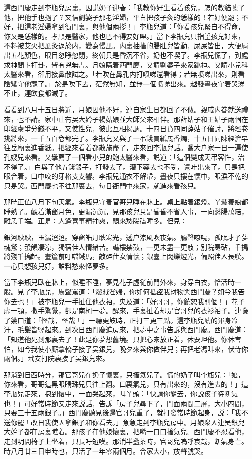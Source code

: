 這西門慶走到李瓶兒房裏，因説奶子迎春：「我教你好生看着孩兒，怎的教貓唬了他，把他手也撾了？又信劉婆子那老淫婦，平白把孩子灸的恁樣的！若好便罷；不好，把這老淫婦拿到衙門裏，與他個兩拶！」李瓶兒道：「你看孩兒緊自不得命，你又是恁樣的。孝順是醫家，他也巴不得要好哩。」當下李瓶兒只指望孩兒好來，不料被艾火把風灸返於内，變為慢風。内裏抽搐的腸肚兒皆動，尿屎皆出，大便屙出五花顏色，眼目忽睜忽閉，終朝只是昏沉不省，奶也不喫了。李瓶兒慌了，到處求神問卜打卦，皆有兇無吉。月娘瞞着西門慶，又請劉婆子來家跳神。又請小兒科太醫來看，卻用接鼻散試之。「若吹在鼻孔内打喷㖒還看得；若無喷㖒出來，則看陰騭守他罷了。」於是吹下去，茫然無知，並無一個喷㖒出來。越發晝夜守着哭涕不止，連飲食都減了。

看看到八月十五日將近，月娘因他不好，連自家生日都回了不做。親戚内眷就送禮來，也不請。家中止有吴大妗子楊姑娘並大師父來相伴。那薛姑子和王姑子兩個在印經䖏爭分錢不平，又使性兒，彼此互相揭調。十四日賁四同薛姑子催討，將經卷挑將來，一千五百卷都完了。李瓶兒又與了一弔錢買紙馬香燭，十五日同陳經濟早往岳廟裏進香紙。把經來看着都散施盡了，走來回李瓶兒話。喬大户家一日一遍使孔嫂兒來看。又擧薦了一個看小兒的鮑太醫來看，説道：「這個變成天弔客忤，治不得了。」白與了他五錢銀子，打發去了。灌下薬去也不受，還吐出來了。只是把眼合着，口中咬的牙格支支響。李瓶兒通衣不解帶，晝夜只摟在懷中，眼淚不乾的只是哭。西門慶也不往那裏去，每日衙門中來家，就進來看孩兒。

那時正值八月下旬天氣。李瓶兒守着官哥兒睡在牀上。桌上點着銀燈。丫鬟養娘都睡熟了。覷着滿窗月色，更漏沉沉，見那孩兒只是昏昏不省人事，一向愁腸萬結，離思千端。正是：人逢喜事精神爽，悶來愁腸磕睡多。但見：

銀河耿耿，玉漏迢迢。穿窗皓月耿寒光，透户涼風吹夜氣。鴈聲嘹喨，孤眠才子夢魂驚；蛩韻凄凉，獨宿佳人情緒苦。譙樓禁鼓，一更未盡一更敲；別院寒砧，千搗將殘千搗起。畫簷前叮噹鐵馬，敲碎仕女情懷；銀臺上閃爍燈光，偏照佳人長嘆。一心只想孩兒好，誰料愁來怪夢多。

當下李瓶兒臥在牀上，似睡不睡，夢見花子虚従前門外來，身穿白衣，恰活時一般。見了李瓶兒，厲聲駡道：「潑賊淫婦，你如何抵盜我財物與西門慶？如今我告你去也！」被李瓶兒一手扯住他衣袖，央及道：「好哥哥，你饒恕我則個！」花子虚一頓，撒手驚覺，卻是南柯一夢。醒來，手裏扯着却是官哥兒的衣衫袖子。連噦了幾口道：「怪哉，怪哉！」一聽更鼓時，正打三更三點。這李瓶兒唬的渾身冷汗，毛髮皆竪起來。到次日西門慶進房來，把夢中之事告訴與西門慶。西門慶道：「知道他死到那裏去了！此是你夢想舊境。只把心來放正着，休要理他。你休害怕，如今我使小廝拿轎子接了吴銀兒，晚夕來與你做伴兒；再把老馮叫來，伏侍你兩個。」玳安打院裏接了吴銀兒來。

那消到日西時分，那官哥兒在奶子懷裏，只搐氣兒了。慌的奶子叫李瓶兒：「娘，你來看，哥哥這黑眼睛珠兒只往上翻。口裏氣兒，只有出來的，沒有進去的！」這李瓶兒走來，抱到懷中，一面哭起來，叫丫頭：「快請你爹去，你説孩子待断氣也！」可好常時節又走來説話，告訴「房子兒尋下了，門面兩間二層，大小四間，只要三十五兩銀子。」西門慶聽見後邊官哥兒重了，就打發常時節起身，説：「我不送你罷！改日我使人拿銀子和你看去。」急急走到李瓶兒房中。月娘衆人連吴銀兒大妗子都在房裏瞧着。那孩子在他娘懷裏，把嘴一口口搐氣兒。西門慶不忍看他，走到明間椅子上坐着，只長吁短嘆。那消半盞茶時，官哥兒嗚呼哀哉，断氣身亡。時八月廿三日申時也，只活了一年零兩個月。合家大小，放聲號哭。

